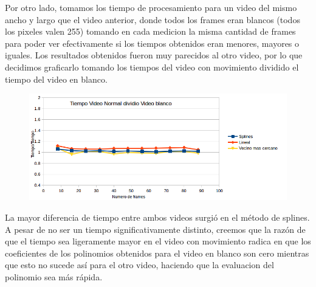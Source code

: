 Por otro lado, tomamos los tiempo de procesamiento para un video del mismo ancho y largo que el video anterior, donde todos los frames eran blancos (todos los pixeles valen 255) tomando en cada medicion la misma cantidad de frames para poder ver efectivamente si los tiempos obtenidos eran menores, mayores o iguales. Los resultados obtenidos fueron muy parecidos al otro video, por lo que decidimos graficarlo tomando los tiempos del video con movimiento dividido el tiempo del video en blanco.

\begin{figure}
  \vspace{-20pt}
  \begin{center}
    \includegraphics[scale= 0.6]{imagenes/aumentandoFramesMessiSobreWhite.png}
  \end{center}
  \vspace{-10pt}
  \vspace{-10pt}
\end{figure}

La mayor diferencia de tiempo entre ambos videos surgió en el método de splines. A pesar de no ser un tiempo significativamente distinto, creemos que la razón de que el tiempo sea ligeramente mayor en el video con movimiento radica en que los coeficientes de los polinomios obtenidos para el video en blanco son cero mientras que esto no sucede así para el otro video, haciendo que la evaluacion del polinomio sea más rápida.









